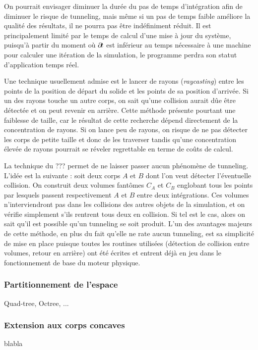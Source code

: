 \begin{figure}
  \centering
  
  \caption{}
  \label{tunneling1}
\end{figure}

On pourrait envisager diminuer la durée du pas de temps d'intégration
afin de diminuer le risque de tunneling, mais même si un pas de temps
faible améliore la qualité des résultats, il ne pourra pas être
indéfiniment réduit. Il est principalement limité par le temps de
calcul d'une mise à jour du système, puisqu'à partir du moment o\`u
$\partial \! t$ est inférieur au temps nécessaire à une machine pour
calculer une itération de la simulation, le programme perdra son
statut d'application temps réel.

Une technique usuellement admise est le lancer de rayons
(\textit{raycasting}) entre les points de la position de départ du
solide et les points de sa position d'arrivée. Si un des rayons touche
un autre corps, on sait qu'une collision aurait dûe être détectée et
on peut revenir en arrière. Cette méthode présente pourtant une
faiblesse de taille, car le résultat de cette recherche dépend
directement de la concentration de rayons. Si on lance peu de rayons,
on risque de ne pas détecter les corps de petite taille et donc de les
traverser tandis qu'une concentration élevée de rayons pourrait se
réveler regrettable en terme de coûts de calcul.

\begin{figure}
  \centering
  
  \caption{}
  \label{tunneling2}
\end{figure}

La technique du ??? permet de ne laisser passer aucun phénomène de
tunneling. L'idée est la suivante : soit deux corps $A$ et $B$ dont
l'on veut détecter l'éventuelle collision. On construit deux volumes
fantômes $C_A$ et $C_B$ englobant tous les points par lesquels passent
respectivement $A$ et $B$ entre deux intégrations. Ces volumes
n'interviendront pas dans les collisions des autres objets de la
simulation, et on vérifie simplement s'ils rentrent tous deux en
collision. Si tel est le cas, alors on sait qu'il est possible qu'un
tunneling se soit produit. L'un des avantages majeurs de cette
méthode, en plus du fait qu'elle ne rate aucun tunneling, est sa
simplicité de mise en place puisque toutes les routines utilisées
(détection de collision entre volumes, retour en arrière) ont été
écrites et entrent déjà en jeu dans le fonctionnement de base du
moteur physique.

\begin{figure}
  \centering
  
  \caption{}
  \label{tunneling3}
\end{figure}

\subsubsection{Partitionnement de l'espace}

Quad-tree, Octree, ...

\subsubsection{Extension aux corps concaves}

blabla
